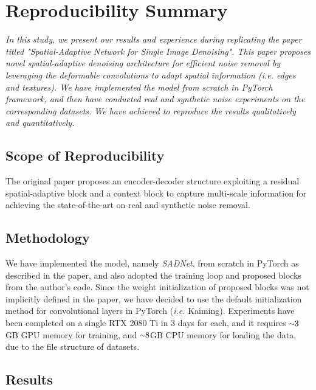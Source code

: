 \section*{\centering Reproducibility Summary}

\textit{In this study, we present our results and experience during replicating the paper titled "Spatial-Adaptive Network for Single Image Denoising". This paper proposes novel spatial-adaptive denoising architecture for efficient noise removal by leveraging the deformable convolutions to adapt spatial information (i.e. edges and textures). We have implemented the model from scratch in PyTorch framework, and then have conducted real and synthetic noise experiments on the corresponding datasets. We have achieved to reproduce the results qualitatively and quantitatively.
}

\subsection*{Scope of Reproducibility}

The original paper proposes an encoder-decoder structure exploiting a residual spatial-adaptive block and a context block to capture multi-scale information for achieving the state-of-the-art on real and synthetic noise removal.

\subsection*{Methodology}

We have implemented the model, namely \textit{SADNet}, from scratch in PyTorch as described in the paper, and also adopted the training loop and proposed blocks from the author's code. Since the weight initialization of proposed blocks was not implicitly defined in the paper, we have decided to use the default initialization method for convolutional layers in PyTorch (\textit{i.e.} Kaiming). Experiments have been completed on a single RTX 2080 Ti in 3 days for each, and it requires ${\raise.17ex\hbox{$\scriptstyle\mathtt{\sim}$}}3$GB GPU memory for training, and ${\raise.17ex\hbox{$\scriptstyle\mathtt{\sim}$}}8$GB CPU memory for loading the data, due to the file structure of datasets.


\subsection*{Results}

